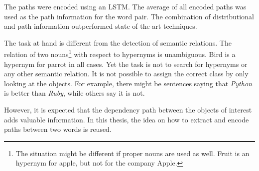 The paths were encoded using an LSTM. The average of all encoded paths was used as the path information for the word pair. The combination of distributional and path information outperformed state-of-the-art techniques.\newline

The task at hand is different from the detection of semantic relations. The relation of two nouns\footnote{The situation might be different if proper nouns are used as well. Fruit is an hypernym for apple, but not for the company Apple.} with respect to hypernyms is unambiguous. Bird is a hypernym for parrot in all cases. Yet the task is not to search for hypernyms or any other semantic relation. It is not possible to assign the correct class by only looking at the objects. For example, there might be sentences saying that \emph{Python} is better than \emph{Ruby}, while others say it is not.

However, it is expected that the dependency path between the objects of interest adds valuable information. In this thesis, the idea on how to extract and encode paths between two words is reused.




